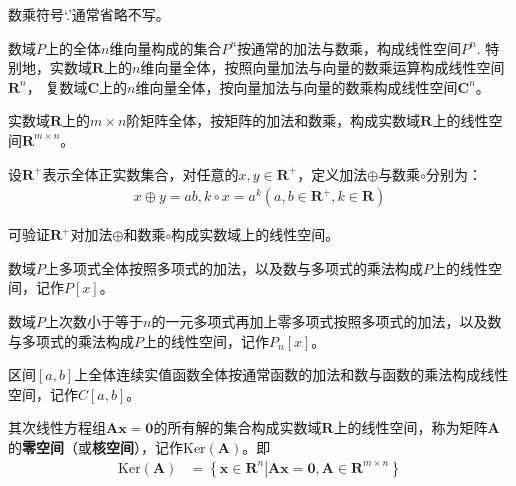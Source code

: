 \begin{remark}
    数乘符号‘.’通常省略不写。
\end{remark}

\begin{example}
    数域$P$上的全体$n$维向量构成的集合$P^{n}$按通常的加法与数乘，构成线性空间$P^{n}$.
    特别地，实数域$\mathbf{R}$上的$n$维向量全体，按照向量加法与向量的数乘运算构成线性空间$\mathbf{R}^{n}$，
    复数域$\mathbf{C}$上的$n$维向量全体，按向量加法与向量的数乘构成线性空间$\mathbf{C}^{n}$。
\end{example}

\begin{example}
    实数域$\mathbf{R}$上的$m\times{n}$阶矩阵全体，按矩阵的加法和数乘，构成实数域$\mathbf{R}$上的线性空间$\mathbf{R}^{m\times{n}}$。
\end{example}

\begin{example}
    \label{example:1-14}
    设$\mathbf{R}^{+}$表示全体正实数集合，对任意的$x,y\in\mathbf{R}^{+}$，定义加法$\oplus$与数乘$\circ$分别为：
    \begin{eqnarray}
        x\oplus{y}=ab,k\circ{x}=a^{k}\left(a,b\in{\mathbf{R}^{+}},k\in\mathbf{R}\right)\nonumber
    \end{eqnarray}
\end{example}
可验证$\mathbf{R}^{+}$对加法$\oplus$和数乘$\circ$构成实数域上的线性空间。

\begin{example}
    数域$P$上多项式全体按照多项式的加法，以及数与多项式的乘法构成$P$上的线性空间，记作$P\left[x\right]$。
\end{example}

\begin{example}
    数域$P$上次数小于等于$n$的一元多项式再加上零多项式按照多项式的加法，以及数与多项式的乘法构成$P$上的线性空间，记作$P_{n}\left[x\right]$。
\end{example}

\begin{example}
    区间$\left[a,b\right]$上全体连续实值函数全体按通常函数的加法和数与函数的乘法构成线性空间，记作$C\left[a,b\right]$。
\end{example}

\begin{example}
    其次线性方程组$\mathbf{Ax}=\mathbf{0}$的所有解的集合构成实数域$\mathbf{R}$上的线性空间，称为矩阵$\mathbf{A}$的\textbf{零空间}（或\textbf{核空间}），记作$\text{Ker}\left(\mathbf{A}\right)$。即
    \begin{eqnarray}
        \text{Ker}\left(\mathbf{A}\right)&=\left\{\mathbf{x}\in{\mathbf{R}^{n}}\left|\mathbf{Ax}=\mathbf{0},\mathbf{A}\in\mathbf{R}^{m\times{n}}\right.\right\}
    \end{eqnarray}
\end{example}

